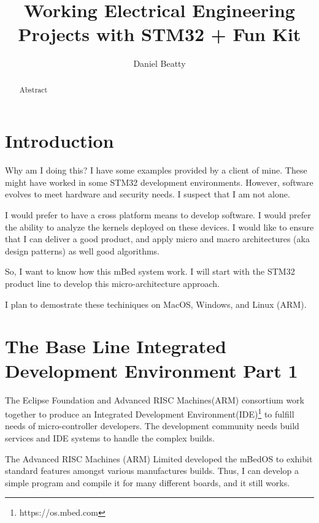 \documentclass{article}
\title{Working Electrical Engineering Projects with STM32 + Fun Kit}
\author{Daniel Beatty}
\begin{document}
\maketitle

\begin{abstract}
    Abstract
\end{abstract}

\section{Introduction}


Why am I doing this?  I have some examples provided by a client of mine.  These might have worked in some STM32 development environments.  However, software evolves to meet hardware and security needs.  I suspect that I am not alone.  

I would prefer to have a cross platform means to develop software. I would prefer the ability to analyze the kernels deployed on these devices.  I would like to ensure that I can deliver a good product, and apply micro and macro architectures (aka design patterns) as well good algorithms.  

So, I want to know how this mBed system work.  I will start with the STM32 product line to develop this micro-architecture approach.  

I plan to demostrate these techiniques on MacOS, Windows, and Linux (ARM).

\newpage
\section{The Base Line Integrated Development Environment Part 1} %
\label{sec:the_base_line_integrated_development_environment_part_1}

The Eclipse Foundation and Advanced RISC Machines(ARM) consortium work together to produce an Integrated Development Environment(IDE)\footnote{https://os.mbed.com} to fulfill needs of micro-controller developers.  The development community needs build services and IDE systems to handle the complex builds. %

The Advanced RISC Machines (ARM) Limited developed the mBedOS to exhibit standard features amongst various manufactures builds.  Thus, I can develop a simple program and compile it for many different boards, and it still works. 
\end{document}
